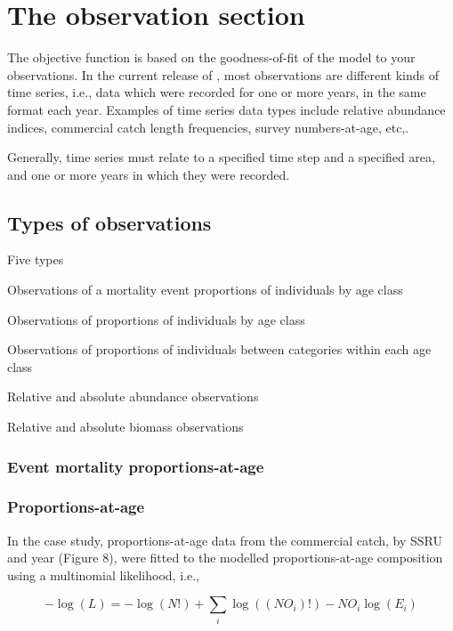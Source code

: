 \section{The observation section\label{sec:observation-section}}

The objective function is based on the goodness-of-fit of the model to your observations. In the current release of \SPM, most observations are different kinds of time series, i.e., data which were recorded for one or more years, in the same format each year. Examples of time series data types include relative abundance indices, commercial catch length frequencies, survey numbers-at-age, etc,. 

Generally, time series must relate to a specified time step and a specified area, and one or more years in which they were recorded.

\subsection{Types of observations}

Five types

\begin{description}
  \item Observations of a mortality event proportions of individuals by age class
  \item Observations of proportions of individuals by age class
  \item Observations of proportions of individuals between categories within each age class
  \item Relative and absolute abundance observations
  \item Relative and absolute biomass observations
\end{description}

\subsubsection{Event mortality proportions-at-age}

\subsubsection{Proportions-at-age}

In the case study, proportions-at-age data from the commercial catch, by SSRU and year (Figure 8), were fitted to the modelled proportions-at-age composition using a multinomial likelihood, i.e., 

\begin{equation}
  -\log \left(L \right) =  -\log \left(N! \right) + \sum\limits_i \log \left( \left(NO_i \right)! \right) - NO_i \log \left(E_i \right)
\end{equation}

